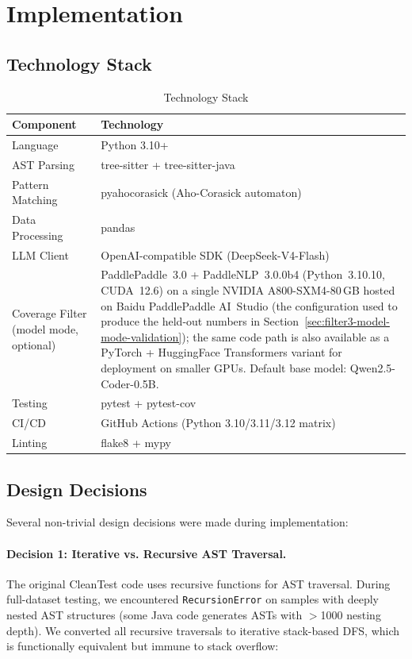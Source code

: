 \documentclass[acmlarge,nonacm,screen]{acmart}
\begin{document}
\section{Implementation}
\label{sec:implementation}

\subsection{Technology Stack}

\begin{table}[H]
\caption{Technology Stack}
\label{tab:tech-stack}
\begin{tabularx}{\linewidth}{@{}lY@{}}
\toprule
\textbf{Component} & \textbf{Technology} \\
\midrule
Language & Python 3.10+ \\
AST Parsing & tree-sitter + tree-sitter-java \\
Pattern Matching & pyahocorasick (Aho-Corasick automaton) \\
Data Processing & pandas \\
LLM Client & OpenAI-compatible SDK (DeepSeek-V4-Flash) \\
Coverage Filter (model mode, optional) & PaddlePaddle~3.0 + PaddleNLP~3.0.0b4 (Python~3.10.10, CUDA~12.6) on a single NVIDIA A800-SXM4-80\,GB hosted on Baidu PaddlePaddle AI~Studio (the configuration used to produce the held-out numbers in Section~\ref{sec:filter3-model-mode-validation}); the same code path is also available as a PyTorch + HuggingFace Transformers variant for deployment on smaller GPUs. Default base model: Qwen2.5-Coder-0.5B. \\
Testing & pytest + pytest-cov \\
CI/CD & GitHub Actions (Python 3.10/3.11/3.12 matrix) \\
Linting & flake8 + mypy \\
\bottomrule
\end{tabularx}
\end{table}

\subsection{Design Decisions}

Several non-trivial design decisions were made during implementation:

\paragraph{Decision 1: Iterative vs. Recursive AST Traversal.}
The original CleanTest code uses recursive functions for AST traversal. During full-dataset testing, we encountered \texttt{RecursionError} on samples with deeply nested AST structures (some Java code generates ASTs with $>$1000 nesting depth). We converted all recursive traversals to iterative stack-based DFS, which is functionally equivalent but immune to stack overflow:
\end{document}
